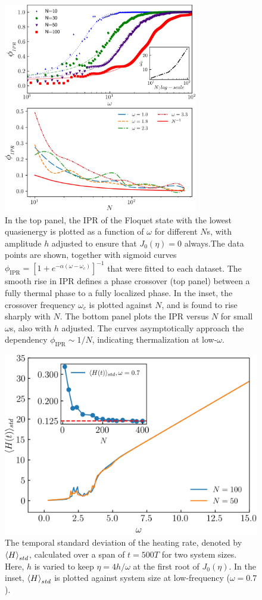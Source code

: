 \documentclass[%
reprint,
superscriptaddress,
amsmath,amssymb,
aps,
prb,
showkeys,
]{revtex4-2}
\begin{document}
\begin{figure}[t!]
	\centering
	\includegraphics[width =8.5cm]{figure_9.jpeg}
	\caption{In the top panel, the IPR of the Floquet state with the lowest quasienergy is plotted as a function of $\omega$ for different $N$s, with amplitude $h$ adjusted to ensure that $J_0(\eta)=0$ always.The data points are shown, together with sigmoid curves $\phi_\mathrm{IPR}=\left[1+e^{-\alpha\left(\omega-\omega_c\right)}\right]^{-1}$ that were fitted to each dataset. The smooth rise in IPR defines a phase crossover (top panel) between a fully thermal phase to a fully localized phase. In the inset, the crossover frequency $\omega_c$ is plotted against $N$, and  is found to rise sharply with $N$. The bottom panel plots the IPR versus $N$ for small $\omega$s, also with $h$ adjusted. The curves asymptotically approach the dependency $\phi_\mathrm{IPR}\sim 1/N$, indicating thermalization at low-$\omega$.}
	\label{fig:phase_crossover}
\end{figure}	
\begin{figure}[ht!]
	\centering
	\includegraphics[width = 8.cm]{figure_10.jpeg}
	\caption{The temporal standard deviation of the heating rate, denoted by $\expval{H}_{std}$, calculated over a span of $t=500 T$ for two system sizes. Here, $h$ is varied to keep $\eta = 4h/\omega$ at the first root of $J_0(\eta)$. In the inset, $\expval{H}_{std}$ is plotted against system size at low-frequency ($\omega=0.7$).}
	\label{fig:havg_std}
\end{figure}
\end{document}
